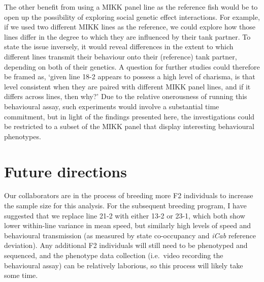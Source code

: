 \documentclass[
]{book}
\begin{document}
The other benefit from using a MIKK panel line as the reference fish would be to open up the possibility of exploring social genetic effect interactions. For example, if we used two different MIKK lines as the reference, we could explore how those lines differ in the degree to which they are influenced by their tank partner. To state the issue inversely, it would reveal differences in the extent to which different lines transmit their behaviour onto their (reference) tank partner, depending on both of their genetics. A question for further studies could therefore be framed as, `given line \textcolor{18-2_FF66A6}{18-2} appears to possess a high level of charisma, is that level consistent when they are paired with different MIKK panel lines, and if it differs across lines, then why?' Due to the relative onerousness of running this behavioural assay, such experiments would involve a substantial time commitment, but in light of the findings presented here, the investigations could be restricted to a subset of the MIKK panel that display interesting behavioural phenotypes.

\hypertarget{future-directions}{%
\section{Future directions}\label{future-directions}}

Our collaborators are in the process of breeding more F2 individuals to increase the sample size for this analysis. For the subsequent breeding program, I have suggested that we replace line \textcolor{21-2_49B500}{21-2} with either \textcolor{13-2_F57A5F}{13-2} or \textcolor{23-1_AFA200}{23-1}, which both show lower within-line variance in mean speed, but similarly high levels of speed and behavioural transmission (as measured by state co-occupancy and \emph{\textcolor{iCab_424B4D}{iCab}} reference deviation). Any additional F2 individuals will still need to be phenotyped and sequenced, and the phenotype data collection (i.e.~video recording the behavioural assay) can be relatively laborious, so this process will likely take some time.
\end{document}
